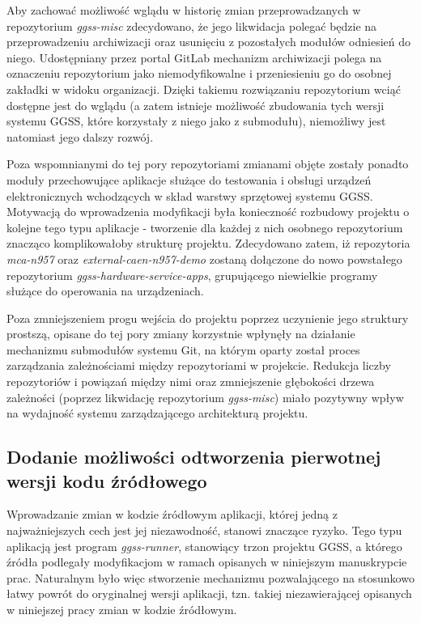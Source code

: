 Aby zachować możliwość wglądu w historię zmian przeprowadzanych w repozytorium \emph{ggss-misc} zdecydowano, że jego likwidacja polegać będzie na przeprowadzeniu archiwizacji oraz usunięciu z pozostałych modułów odniesień do niego. Udostępniany przez portal GitLab mechanizm archiwizacji polega na oznaczeniu repozytorium jako niemodyfikowalne i przeniesieniu go do osobnej zakładki w widoku organizacji. Dzięki takiemu rozwiązaniu repozytorium wciąć dostępne jest do wglądu (a zatem istnieje możliwość zbudowania tych wersji systemu GGSS, które korzystały z niego jako z submodułu), niemożliwy jest natomiast jego dalszy rozwój.


Poza wspomnianymi do tej pory repozytoriami zmianami objęte zostały ponadto moduły przechowujące aplikacje służące do testowania i obsługi urządzeń elektronicznych wchodzących w skład warstwy sprzętowej systemu GGSS. Motywacją do wprowadzenia modyfikacji była konieczność rozbudowy projektu o kolejne tego typu aplikacje - tworzenie dla każdej z nich osobnego repozytorium znacząco komplikowałoby strukturę projektu. Zdecydowano zatem, iż repozytoria \emph{mca-n957} oraz \emph{external-caen-n957-demo} zostaną dołączone do nowo powstałego repozytorium \emph{ggss-hardware-service-apps}, grupującego niewielkie programy służące do operowania na urządzeniach.


Poza zmniejszeniem progu wejścia do projektu poprzez uczynienie jego struktury prostszą, opisane do tej pory zmiany korzystnie wpłynęły na działanie mechanizmu submodułów systemu Git, na którym oparty został proces zarządzania zależnościami między repozytoriami w projekcie. Redukcja liczby repozytoriów i powiązań między nimi oraz zmniejszenie głębokości drzewa zależności (poprzez likwidację repozytorium \emph{ggss-misc}) miało pozytywny wpływ na wydajność systemu zarządzającego architekturą projektu. 



\subsection{Dodanie możliwości odtworzenia pierwotnej wersji kodu źródłowego}
Wprowadzanie zmian w kodzie źródłowym aplikacji, której jedną z najważniejszych cech jest jej niezawodność, stanowi znaczące ryzyko. Tego typu aplikacją jest program \emph{ggss-runner}, stanowiący trzon projektu GGSS, a którego źródła podlegały modyfikacjom w ramach opisanych w niniejszym manuskrypcie prac. Naturalnym było więc stworzenie mechanizmu pozwalającego na stosunkowo łatwy powrót do oryginalnej wersji aplikacji, tzn. takiej niezawierającej opisanych w niniejszej pracy zmian w kodzie źródłowym.

